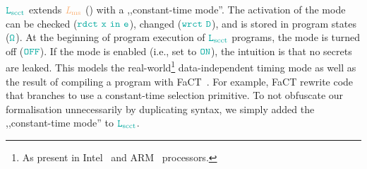\documentclass[acmsmall]{acmart}
\theoremstyle{definition}
\begin{document}
$\Lscct$ extends $\Lms$ () with a ,,constant-time mode''. 
The activation of the mode can be checked ($\obj{\lrddoit{x}{\expr}}$), changed ($\obj{\lwrdoit{D}}$), and is stored in program states ($\obj{\Omega}$).
At the beginning of program execution of $\Lscct$ programs, the mode is turned off ($\obj{OFF}$).
If the mode is enabled (i.e., set to $\obj{ON}$), the intuition is that no secrets are leaked. 
This models the real-world\footnote{As present in Intel~\cite[p.80]{intel-refman} and ARM~\cite[p.~543]{arm-refman} processors.} data-independent timing mode as well as the result of compiling a program with FaCT~\cite{cauligi2019fact}.
For example, FaCT rewrite code that branches to use a constant-time selection primitive.
To not obfuscate our formalisation unnecessarily by duplicating syntax, we simply added the ,,constant-time mode'' to $\Lscct$.

\end{document}
